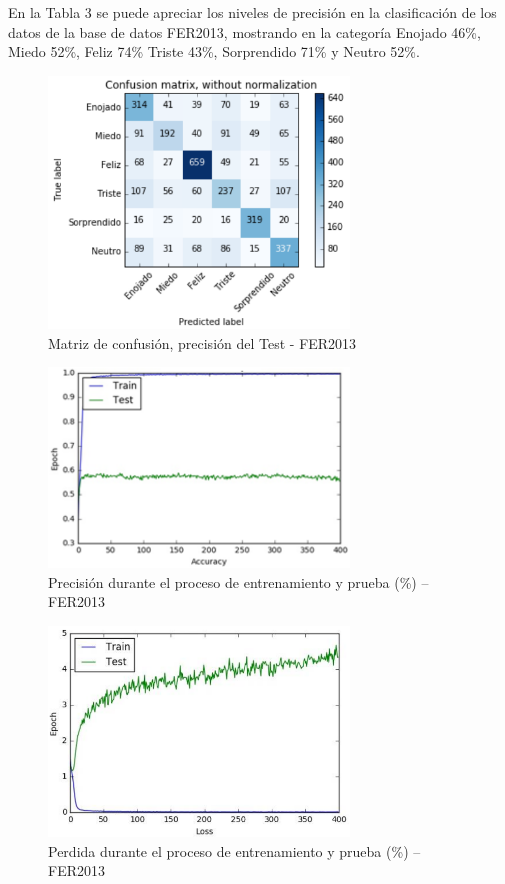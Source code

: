En la Tabla 3 se puede apreciar los niveles de precisión en la clasificación de los
datos de la base de datos FER2013, mostrando en la categoría Enojado 46\%, Miedo 52\%,
Feliz 74\% Triste 43\%, Sorprendido 71\% y Neutro 52\%.

\begin{figure}[H]
		\centering
		\includegraphics[width=80mm]{Imagenes/matriz_confusion_fer.png}
		\caption{Matriz de confusión, precisión del Test - FER2013}
		\label{fig:matriz_confusion_fer}
\end{figure}

\begin{figure}[H]
		\centering
		\includegraphics[width=80mm]{Imagenes/precision_fer.png}
		\caption{Precisión durante el proceso de entrenamiento y prueba (\%) – FER2013}
		\label{fig:precision_fer}
\end{figure}

\begin{figure}[H]
		\centering
		\includegraphics[width=80mm]{Imagenes/perdida_fer.png}
		\caption{Perdida durante el proceso de entrenamiento y prueba (\%) – FER2013}
		\label{fig:perdida_fer}
\end{figure}

